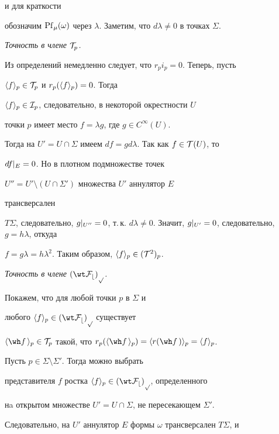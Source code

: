 \begin{pf}
и для краткости


обозначим $\Pf_\mu(\omega)$ через $\lambda$. Заметим, что $d\lambda


\ne 0$ в точках $\Sigma$.





{\em Точность в члене ${\cal T}_p$.}


Из определений немедленно следует, что $r_p i_p = 0$. Теперь, пусть


$\langle f \rangle_{p} \in {\cal T}_p$ и $r_p(\langle f \rangle_{p})=0$. Тогда


$\langle f \rangle_{p} \in {\cal I}_p$, следовательно, в некоторой окрестности $U$


точки $p$ имеет место $f = \lambda g$, где $g \in C^\infty(U)$.


Тогда на $U' = U \cap \Sigma$ имеем $df = g d\lambda$. Так как $f \in


\cT(U)$, то


$df |_{E} = 0$. Но в плотном подмножестве точек


$U'' = U' \setminus (U \cap \Sigma')$ множества $U'$ аннулятор $E$


трансверсален


$T\Sigma$, следовательно, $\rest{g}{U''} = 0$, т.\,к. $d\lambda \ne


0$. Значит, $\rest{g}{U'} = 0$, следовательно, $g = h \lambda$, откуда


$f = g \lambda = h \lambda^2$. Таким образом, $\langle f \rangle_{p} \in ({\cal T}^2)_p$.





{\em Точность в члене $(\wt\cF_b)_p$.}


Покажем, что для любой точки $p$ в $\Sigma$ и


любого $\germ{f}{p} \in (\wt\cF_b)_p$ существует


$\germ{\wh f\,}{p} \in \cT_p$ такой, что $r_p(\germ{\wh f\,}{p}) =


\germ{r(\wh f\,)}{p} = \germ{f}{p}$.





Пусть $p \in \Sigma\setminus\Sigma'$. Тогда можно выбрать


представителя $f$ ростка $\germ{f}{p} \in (\wt\cF_b)_p$, определенного


нa открытом множестве $U' = U \cap \Sigma$, не пересекающем $\Sigma'$.


Следовательно, на $U'$ аннулятор $E$ формы $\omega$ трансверсален $T\Sigma$, и



\end{pf}
